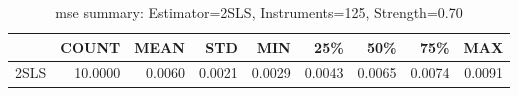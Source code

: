 \begin{table}[ht]
\centering
\caption{mse summary: Estimator=2SLS, Instruments=125, Strength=0.70}
\begin{tabular}{lrrrrrrrr}
\toprule
 & COUNT & MEAN & STD & MIN & 25\% & 50\% & 75\% & MAX \\
\midrule
2SLS & 10.0000 & 0.0060 & 0.0021 & 0.0029 & 0.0043 & 0.0065 & 0.0074 & 0.0091 \\
\bottomrule
\end{tabular}
\end{table}
